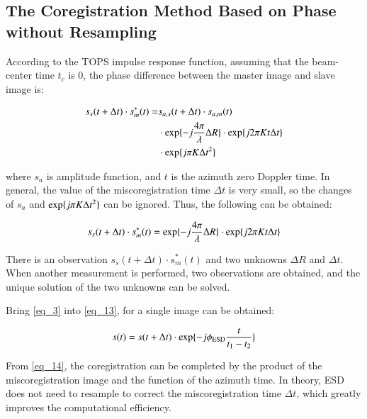 \documentclass[preprint, authoryear]{elsarticle}
\begin{document}
\subsection{The Coregistration Method Based on Phase without Resampling}

According to the TOPS impulse response function, assuming that the beam-center time $t_c$ is 0, the phase difference between the master image and slave image is: \par

\begin{equation}
\begin{split}
s_s(t + \Delta t) \cdot s_m^*(t) = & s_{a, s}(t + \Delta t) \cdot s_{a, m}(t)  \\
& \cdot {\rm exp} \{-j \frac{4 \pi}{\lambda} \Delta R\} \cdot {\rm exp} \{j 2 \pi K t \Delta t\} \\
& \cdot {\rm exp} \{ j \pi K \Delta t^2\}
\end{split}
\label{eq_12}
\end{equation}

\noindent where $s_a$ is amplitude function, and $t$ is the azimuth zero Doppler time. In general, the value of the miscoregistration time $\Delta t$ is very small, so the changes of $s_a$ and ${\rm exp} \{ j \pi K \Delta t^2\}$ can be ignored. Thus, the following can be obtained: \par

\begin{equation}
    s_s(t + \Delta t) \cdot s_m^*(t) = {\rm exp} \{-j \frac{4 \pi}{\lambda} \Delta R\} \cdot {\rm exp} \{j 2 \pi K t \Delta t\}
    \label{eq_13}
\end{equation}

\noindent There is an observation $s_s(t + \Delta t) \cdot s_m^*(t)$ and two unknowns $\Delta R$ and $\Delta t$. When another measurement is performed, two observations are obtained, and the unique solution of the two unknowns can be solved. \par
Bring \ref{eq_3} into \ref{eq_13}, for a single image can be obtained: \par

\begin{equation}
    s(t) = s(t + \Delta t) \cdot {\rm exp} \{-j \phi_{\rm ESD} \frac{t}{t_1 - t_2}\}
    \label{eq_14}
\end{equation}

\noindent From \ref{eq_14}, the coregistration can be completed by the product of the miscoregistration image and the function of the azimuth time. In theory, ESD does not need to resample to correct the miscoregistration time $\Delta t$, which greatly improves the computational efficiency. \par
\end{document}
